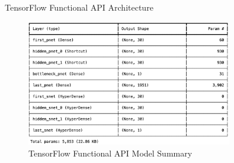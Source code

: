 \documentclass{beamer}
\begin{document}
\begin{frame}{TensorFlow Functional API Architecture}
    \begin{figure}
        \includegraphics[width=0.8\textwidth]{functional-model.png}
        \caption{TensorFlow Functional API Model Summary}
    \end{figure}
\end{frame}
\end{document}
